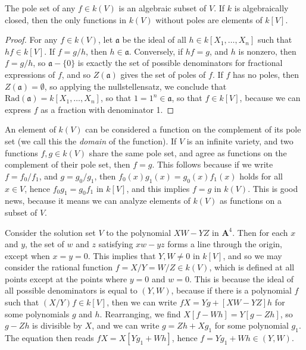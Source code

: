 \begin{prop}
    The pole set of any $f \in k(V)$ is an algebraic subset of $V$. If $k$ is algebraically closed, then the only functions in $k(V)$ without poles are elements of $k[V]$.
\end{prop}
\begin{proof}
    For any $f \in k(V)$, let $\mathfrak{a}$ be the ideal of all $h \in k[X_1, \dots, X_n]$ such that $hf \in k[V]$. If $f = g/h$, then $h \in \mathfrak{a}$. Conversely, if $hf = g$, and $h$ is nonzero, then $f = g/h$, so $\mathfrak{a} - \{ 0 \}$ is exactly the set of possible denominators for fractional expressions of $f$, and so $Z(\mathfrak{a})$ gives the set of poles of $f$. If $f$ has no poles, then $Z(\mathfrak{a}) = \emptyset$, so applying the nullstellensatz, we conclude that $\text{Rad}(\mathfrak{a}) = k[X_1, \dots, X_n]$, so that $1 = 1^n \in \mathfrak{a}$, so that $f \in k[V]$, because we can express $f$ as a fraction with denominator 1.
\end{proof}

An element of $k(V)$ can be considered a function on the complement of its pole set (we call this the \emph{domain} of the function). If $V$ is an infinite variety, and two functions $f,g \in k(V)$ share the same pole set, and agree as functions on the complement of their pole set, then $f = g$. This follows because if we write $f = f_0/f_1$, and $g = g_0/g_1$, then $f_0(x) g_1(x) = g_0(x) f_1(x)$ holds for all $x \in V$, hence $f_0g_1 = g_0f_1$ in $k[V]$, and this implies $f = g$ in $k(V)$. This is good news, because it means we can analyze elements of $k(V)$ as functions on a subset of $V$.

\begin{example}
    Consider the solution set $V$ to the polynomial $XW - YZ$ in $\mathbf{A}^4$. Then for each $x$ and $y$, the set of $w$ and $z$ satisfying $xw - yz$ forms a line through the origin, except when $x = y = 0$. This implies that $Y,W \neq 0$ in $k[V]$, and so we may consider the rational function $f = X/Y = W/Z \in k(V)$, which is defined at all points except at the points where $y = 0$ and $w = 0$. This is because the ideal of all possible denominators is equal to $(Y,W)$, because if there is a polynomial $f$ such that $(X/Y)f \in k[V]$, then we can write $fX = Yg + [XW - YZ]h$ for some polynomials $g$ and $h$. Rearranging, we find $X[f - Wh] = Y[g-Zh]$, so $g - Zh$ is divisible by $X$, and we can write $g = Zh + Xg_1$ for some polynomial $g_1$. The equation then reads $fX = X[Yg_1 + Wh]$, hence $f = Yg_1 + Wh \in (Y,W)$.
\end{example}

